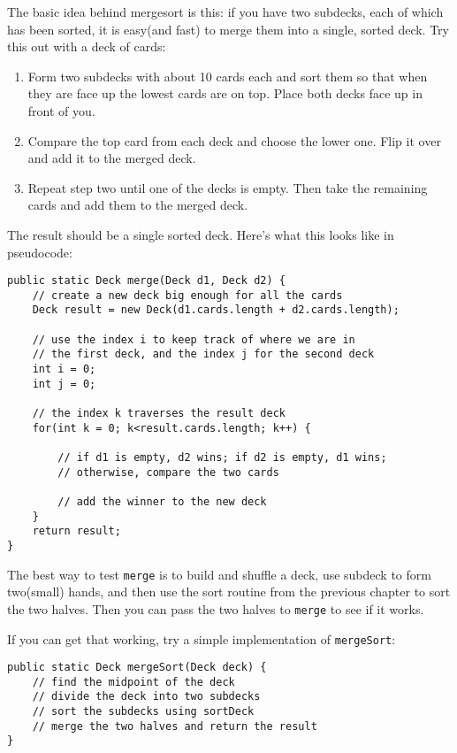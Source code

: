 \documentclass{book}
\begin{document}
The basic idea behind mergesort is this: if you have two subdecks,
each of which has been sorted, it is easy(and fast) to merge them
into a single, sorted deck.  Try this out with a deck of cards:

\begin{enumerate}

\item Form two subdecks with about 10 cards each and sort
them so that when they are face up the lowest cards are on
top.  Place both decks face up in front of you.

\item Compare the top card from each deck and choose the
lower one.  Flip it over and add it to the merged deck.

\item Repeat step two until one of the decks is empty.
Then take the remaining cards and add them to the merged
deck.

\end{enumerate}

The result should be a single sorted deck.  Here's what this
looks like in pseudocode:

\begin{verbatim}
public static Deck merge(Deck d1, Deck d2) {
    // create a new deck big enough for all the cards
    Deck result = new Deck(d1.cards.length + d2.cards.length);

    // use the index i to keep track of where we are in
    // the first deck, and the index j for the second deck
    int i = 0;
    int j = 0;
		
    // the index k traverses the result deck
    for(int k = 0; k<result.cards.length; k++) {
			
        // if d1 is empty, d2 wins; if d2 is empty, d1 wins;
        // otherwise, compare the two cards
			
        // add the winner to the new deck
    }
    return result;
}
\end{verbatim}

The best way to test {\tt merge} is to build and shuffle a deck,
use subdeck to form two(small) hands, and then use the sort
routine from the previous chapter to sort the two halves.  Then
you can pass the two halves to {\tt merge} to see if it works.


If you can get that working, try a simple implementation of
{\tt mergeSort}:

\begin{verbatim}
public static Deck mergeSort(Deck deck) {
    // find the midpoint of the deck
    // divide the deck into two subdecks
    // sort the subdecks using sortDeck
    // merge the two halves and return the result
}
\end{verbatim}
\end{document}
